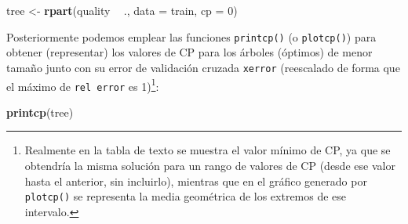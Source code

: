 \documentclass[
]{book}
\newenvironment{Shaded}{\begin{snugshade}}{\end{snugshade}}
\newcommand{\DataTypeTok}[1]{\textcolor[rgb]{0.13,0.29,0.53}{#1}}
\newcommand{\DecValTok}[1]{\textcolor[rgb]{0.00,0.00,0.81}{#1}}
\newcommand{\KeywordTok}[1]{\textcolor[rgb]{0.13,0.29,0.53}{\textbf{#1}}}
\newcommand{\NormalTok}[1]{#1}
\newcommand{\OperatorTok}[1]{\textcolor[rgb]{0.81,0.36,0.00}{\textbf{#1}}}
\newcommand{\StringTok}[1]{\textcolor[rgb]{0.31,0.60,0.02}{#1}}
\theoremstyle{break}
\theoremstyle{definition}
\theoremstyle{definition}
\theoremstyle{definition}
\theoremstyle{remark}
\begin{document}
\begin{Shaded}
\begin{Highlighting}[]
\NormalTok{tree <-}\StringTok{ }\KeywordTok{rpart}\NormalTok{(quality }\OperatorTok{~}\StringTok{ }\NormalTok{., }\DataTypeTok{data =}\NormalTok{ train, }\DataTypeTok{cp =} \DecValTok{0}\NormalTok{)}
\end{Highlighting}
\end{Shaded}

Posteriormente podemos emplear las funciones \texttt{printcp()} (o \texttt{plotcp()}) para obtener (representar)
los valores de CP para los árboles (óptimos) de menor tamaño junto con su error de validación cruzada
\texttt{xerror} (reescalado de forma que el máximo de \texttt{rel\ error} es 1)\footnote{Realmente en la tabla de texto se muestra el valor mínimo de CP, ya que se obtendría la misma solución para un rango de valores de CP (desde ese valor hasta el anterior, sin incluirlo), mientras que en el gráfico generado por \texttt{plotcp()} se representa la media geométrica de los extremos de ese intervalo.}:

\begin{Shaded}
\begin{Highlighting}[]
\KeywordTok{printcp}\NormalTok{(tree)}
\end{Highlighting}
\end{Shaded}
\end{document}
